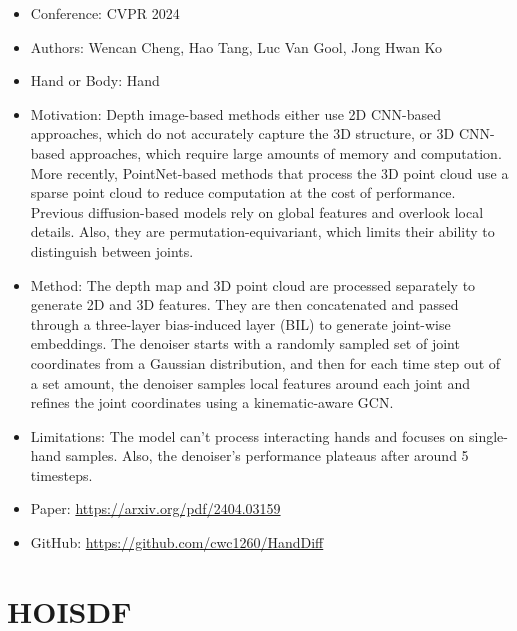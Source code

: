 \documentclass{article}
\begin{document}
\begin{itemize}
    \item Conference: CVPR 2024
    \item Authors: Wencan Cheng, Hao Tang, Luc Van Gool, Jong Hwan Ko
    \item Hand or Body: Hand
    \item Motivation: Depth image-based methods either use 2D CNN-based approaches, which do not accurately capture the 3D structure, or 3D CNN-based approaches, which require large amounts of memory and computation. More recently, PointNet-based methods that process the 3D point cloud use a sparse point cloud to reduce computation at the cost of performance. Previous diffusion-based models rely on global features and overlook local details. Also, they are permutation-equivariant, which limits their ability to distinguish between joints.
    \item Method: The depth map and 3D point cloud are processed separately to generate 2D and 3D features. They are then concatenated and passed through a three-layer bias-induced layer (BIL) to generate joint-wise embeddings. The denoiser starts with a randomly sampled set of joint coordinates from a Gaussian distribution, and then for each time step out of a set amount, the denoiser samples local features around each joint and refines the joint coordinates using a kinematic-aware GCN.
    \item Limitations: The model can't process interacting hands and focuses on single-hand samples. Also, the denoiser's performance plateaus after around 5 timesteps.
    \item Paper: \url{https://arxiv.org/pdf/2404.03159}
    \item GitHub: \url{https://github.com/cwc1260/HandDiff}
\end{itemize}

\section*{HOISDF}
\end{document}
